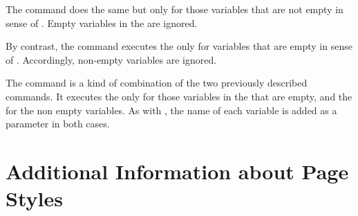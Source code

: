 The  command does the same but only for those
variables that are not empty in sense of
. Empty variables in the  are ignored.

By contrast, the  command executes the
 only for variables that are empty in sense of
. Accordingly, non-empty variables are
ignored.

The  command is a kind of combination of the two
previously described commands. It executes the  only for
those variables in the  that are empty, and the
 for the non empty variables. As with , the
name of each variable is added as a parameter in both cases.%
\EndIndexGroup
%
\EndIndexGroup


\section{Additional Information about Page Styles}
\BeginIndexGroup
{}

%
\EndIndexGroup

\iffalse%
\section{Differences in How \Package{scrletter} Handles \File{lco} Files}
\seclabel{lcoatscrletter}
\BeginIndexGroup
\BeginIndex{File}{lco}
\BeginIndex{}{lco file=\File{lco} file}

As\ChangedAt{v3.15}{\Package{scrletter}} explained in
\autoref{sec:scrlttr2.lcoFile}, \Class{scrlttr2} can load \File{lco} files via
the optional argument of \Macro{documentclass}. The \Package{scrletter} package
does not support this.

\begin{Declaration}
  \Macro{LoadLetterOption}\Parameter{name}%
  \Macro{LoadLetterOptions}\Parameter{list of names}
\end{Declaration}
For \Class{scrlttr2}, load \File{lco} files with
\DescRef{scrlttr2.cmd.LoadLetterOption} or
\DescRef{scrlttr2.cmd.LoadLetterOptions} is only a recommendation. For
\Package{scrletter}, it is mandatory. Of course, you can only load the
\File{lco} files after you load \Package{scrletter}.
%
\EndIndexGroup
%
\EndIndexGroup
\fi


